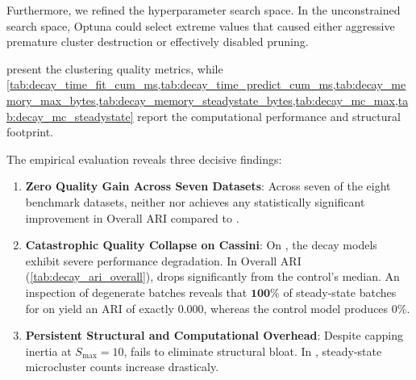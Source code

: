 Furthermore, we refined the hyperparameter search space. In the unconstrained search space, Optuna could select extreme values that caused either aggressive premature cluster destruction or effectively disabled pruning.

 present the clustering quality metrics, while \cref{tab:decay_time_fit_cum_ms,tab:decay_time_predict_cum_ms,tab:decay_memory_max_bytes,tab:decay_memory_steadystate_bytes,tab:decay_mc_max,tab:decay_mc_steadystate} report the computational performance and structural footprint.






The empirical evaluation reveals three decisive findings:

\begin{enumerate}
    \item \textbf{Zero Quality Gain Across Seven Datasets}: Across seven of the eight benchmark datasets, neither  nor  achieves any statistically significant improvement in Overall ARI compared to .
    \item \textbf{Catastrophic Quality Collapse on Cassini}: On \Cassini, the decay models exhibit severe performance degradation. In Overall ARI (\cref{tab:decay_ari_overall}),  drops significantly from the control's median. An inspection of degenerate batches reveals that $\mathbf{100\%}$ of steady-state batches for  on \Cassini yield an ARI of exactly $0.000$, whereas the control model produces $0\%$.
    \item \textbf{Persistent Structural and Computational Overhead}: Despite capping inertia at $S_{\max} = 10$,  fails to eliminate structural bloat. In \ChameleonDSThree, steady-state microcluster counts increase drasticaly.
\end{enumerate}








